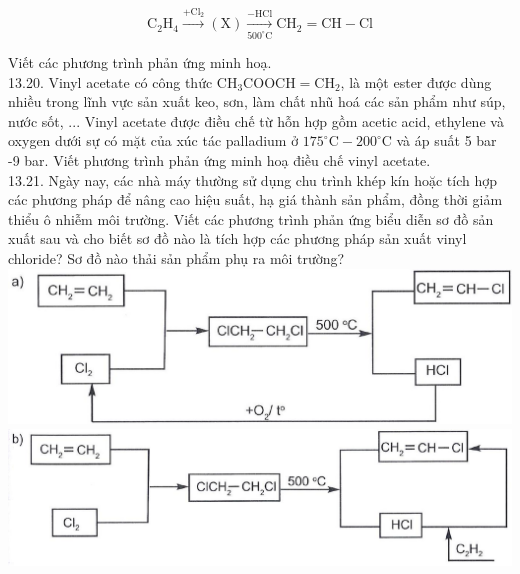 \documentclass[10pt]{article}
\begin{document}
$$
\mathrm{C}_{2} \mathrm{H}_{4} \xrightarrow{+\mathrm{Cl}_{2}}(\mathrm{X}) \xrightarrow[500^{\circ} \mathrm{C}]{-\mathrm{HCl}} \mathrm{CH}_{2}=\mathrm{CH}-\mathrm{Cl}
$$

Viết các phương trình phản ứng minh hoạ.\\
13.20. Vinyl acetate có công thức $\mathrm{CH}_{3} \mathrm{COOCH}=\mathrm{CH}_{2}$, là một ester được dùng nhiều trong lĩnh vực sản xuất keo, sơn, làm chất nhũ hoá các sản phẩm như súp, nước sốt, ... Vinyl acetate được điều chế từ hỗn hợp gồm acetic acid, ethylene và oxygen dưới sự có mặt của xúc tác palladium ở $175^{\circ} \mathrm{C} -200^{\circ} \mathrm{C}$ và áp suất 5 bar -9 bar. Viết phương trình phản ứng minh hoạ điều chế vinyl acetate.\\
13.21. Ngày nay, các nhà máy thường sử dụng chu trình khép kín hoặc tích hợp các phương pháp để nâng cao hiệu suất, hạ giá thành sản phẩm, đồng thời giảm thiểu ô nhiễm môi trường. Viết các phương trình phản ứng biểu diễn sơ đồ sản xuất sau và cho biết sơ đồ nào là tích hợp các phương pháp sản xuất vinyl chloride? Sơ đồ nào thải sản phẩm phụ ra môi trường?\\
\includegraphics[max width=\textwidth, center]{2025_10_23_ae7aef68fb3b41082d29g-27(1)}\\
\includegraphics[max width=\textwidth, center]{2025_10_23_ae7aef68fb3b41082d29g-27(2)}
\end{document}
